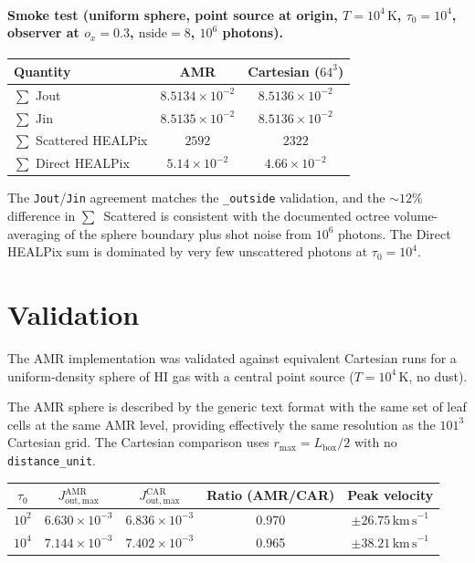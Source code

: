 \documentclass[english,a4paper]{my_memo}
\begin{document}
\paragraph{Smoke test (uniform sphere, point source at origin,
$T=10^4\,\mathrm{K}$, $\tau_0=10^4$, observer at $o_x=0.3$,
$\mathrm{nside}=8$, $10^6$ photons).}
\begin{center}
\begin{tabular}{lcc}
\hline
Quantity                          & AMR              & Cartesian ($64^3$) \\
\hline
$\sum$ Jout                       & $8.5134 \times 10^{-2}$ & $8.5136 \times 10^{-2}$ \\
$\sum$ Jin                        & $8.5135 \times 10^{-2}$ & $8.5136 \times 10^{-2}$ \\
$\sum$ Scattered HEALPix          & $2592$           & $2322$ \\
$\sum$ Direct HEALPix             & $5.14 \times 10^{-2}$ & $4.66 \times 10^{-2}$ \\
\hline
\end{tabular}
\end{center}

\noindent The \texttt{Jout}/\texttt{Jin} agreement matches the
\texttt{\_outside} validation, and the $\sim 12\%$ difference in
$\sum$~Scattered is consistent with the documented octree
volume-averaging of the sphere boundary plus shot noise from
$10^6$ photons.  The Direct HEALPix sum is dominated by very few
unscattered photons at $\tau_0=10^4$.

\section{Validation}

The AMR implementation was validated against equivalent Cartesian runs
for a uniform-density sphere of HI gas with a central point source
($T = 10^4\,\mathrm{K}$, no dust).

The AMR sphere is described by the generic text format with the same set of
leaf cells at the same AMR level, providing effectively the same resolution
as the $101^3$ Cartesian grid.  The Cartesian comparison uses
$r_\mathrm{max} = L_\mathrm{box}/2$ with no \texttt{distance\_unit}.

\begin{center}
\begin{tabular}{ccccc}
\hline
$\tau_0$ & $J_\mathrm{out,max}^\mathrm{AMR}$
         & $J_\mathrm{out,max}^\mathrm{CAR}$
         & Ratio (AMR/CAR)
         & Peak velocity \\
\hline
$10^2$   & $6.630 \times 10^{-3}$ & $6.836 \times 10^{-3}$ & 0.970 & $\pm 26.75\,\mathrm{km\,s}^{-1}$ \\
$10^4$   & $7.144 \times 10^{-3}$ & $7.402 \times 10^{-3}$ & 0.965 & $\pm 38.21\,\mathrm{km\,s}^{-1}$ \\
\hline
\end{tabular}
\end{center}
\end{document}
